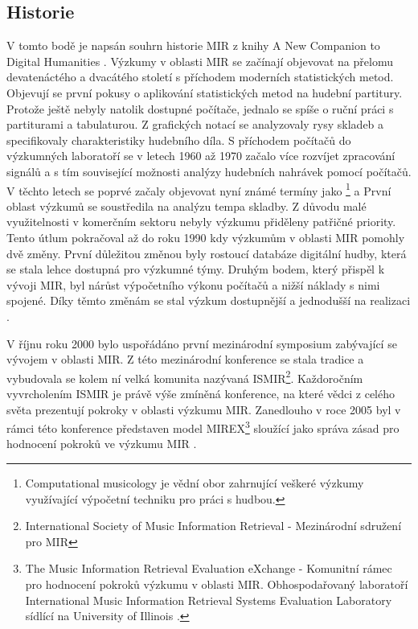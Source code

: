     \subsection{Historie}
    V tomto bodě je napsán souhrn historie MIR z knihy A New Companion to Digital Humanities \cite{a_new_companion_to_digital_humanities}.
    Výzkumy v oblasti \acs{MIR} se začínají objevovat na přelomu devatenáctého a dvacátého století s příchodem moderních statistických metod.
    Objevují se první pokusy o aplikování statistických metod na hudební partitury.
    Protože ještě nebyly natolik dostupné počítače, jednalo se spíše o ruční práci s partiturami a tabulaturou.
    Z grafických notací se analyzovaly rysy skladeb a specifikovaly charakteristiky hudebního díla.
    S příchodem počítačů do výzkumných laboratoří se v letech 1960 až 1970 začalo více rozvíjet zpracování signálů a s tím související možnosti analýzy hudebních nahrávek pomocí počítačů.
    V těchto letech se poprvé začaly objevovat nyní známé termíny jako \footnote{Computational musicology je vědní obor zahrnující veškeré výzkumy využívající výpočetní techniku pro práci s hudbou. } a 
    První oblast výzkumů se soustředila na analýzu tempa skladby. Z důvodu malé využitelnosti v komerčním sektoru nebyly výzkumu přiděleny patřičné priority.
    Tento útlum pokračoval až do roku 1990 kdy výzkumům v oblasti \acs{MIR} pomohly dvě změny.
    První důležitou změnou byly rostoucí databáze digitální hudby, která se stala lehce dostupná pro výzkumné týmy.
    Druhým bodem, který přispěl k vývoji \acs{MIR}, byl nárůst výpočetního výkonu počítačů a nižší náklady s nimi spojené.
    Díky těmto změnám se stal výzkum dostupnější a jednodušší na realizaci \cite{a_new_companion_to_digital_humanities}.

    V říjnu roku 2000 bylo uspořádáno první mezinárodní symposium zabývající se vývojem v oblasti \acs{MIR}.
    Z této mezinárodní konference se stala tradice a vybudovala se kolem ní velká komunita nazývaná \acs{ISMIR}\footnote{International Society of Music Information Retrieval - Mezinárodní sdružení pro \acs{MIR}}.
    Každoročním vyvrcholením \acs{ISMIR} je právě výše zmíněná konference, na které vědci z celého světa prezentují pokroky v oblasti výzkumu \acs{MIR}.
    Zanedlouho v roce 2005 byl v rámci této konference představen model \acs{MIREX}\footnote{The Music Information Retrieval Evaluation eXchange - Komunitní rámec pro hodnocení pokroků výzkumu v oblasti \acs{MIR}.
    Obhospodařovaný laboratoří International Music Information Retrieval Systems Evaluation Laboratory sídlící na University of Illinois \cite{Downie2010}.}
    sloužící jako správa zásad pro hodnocení pokroků ve výzkumu \acs{MIR} \cite{Downie2010}.
    

